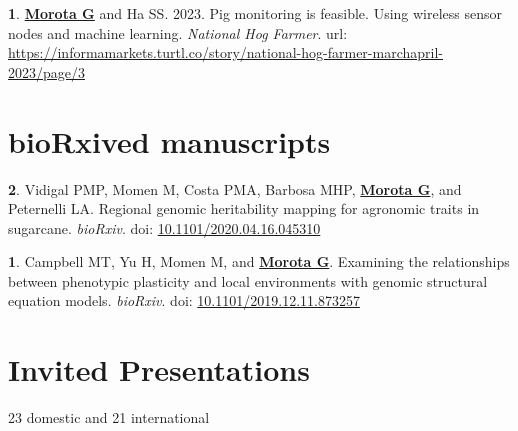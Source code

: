 \documentclass[margin,line,10pt]{res}
\newenvironment{list1}{
  \begin{list}{\ding{113}}{%
      \setlength{\itemsep}{0in}
      \setlength{\parsep}{0in} \setlength{\parskip}{0in}
      \setlength{\topsep}{0in} \setlength{\partopsep}{0in} 
      \setlength{\leftmargin}{0.17in}}}{\end{list}}
\begin{document}
\begin{resume}
\begin{list1}
  \item [{\bf 1}.] \textbf{\underline{Morota G}} and Ha SS. 2023. Pig monitoring is feasible. Using wireless sensor nodes and machine learning. \emph{National Hog Farmer}. url: \textcolor{blue}{\href{https://informamarkets.turtl.co/story/national-hog-farmer-marchapril-2023/page/3}{https://informamarkets.turtl.co/story/national-hog-farmer-marchapril-2023/page/3}}

\end{list1}




\vspace{1.0cm}
\section{\sc bioRxived manuscripts}

\begin{list1}

  \item [{\bf 2}.] Vidigal PMP, Momen M, Costa PMA, Barbosa MHP, \textbf{\underline{Morota G}}, and Peternelli LA. Regional genomic heritability mapping for agronomic traits in sugarcane. \emph{bioRxiv}. doi: \textcolor{blue}{\href{https://doi.org/10.1101/2020.04.16.045310}{10.1101/2020.04.16.045310}}

  \vspace{0.5cm}

\item [{\bf 1}.] Campbell MT, Yu H, Momen M, and \textbf{\underline{Morota G}}. Examining the relationships between phenotypic plasticity and local environments with genomic structural equation models. \emph{bioRxiv}. doi: \textcolor{blue}{\href{https://doi.org/10.1101/2019.12.11.873257}{10.1101/2019.12.11.873257}}
  

\end{list1}




\vspace{1.0cm}
\section{\sc Invited Presentations}
\vspace{0.5cm}
23 domestic and 21 international \\
\noindent



\end{resume}
\end{document}
